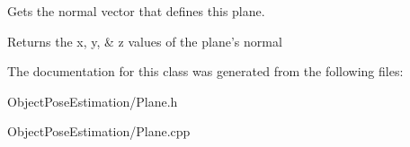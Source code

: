 Gets the normal vector that defines this plane. 

\begin{DoxyReturn}{Returns}
the x, y, \& z values of the plane's normal 
\end{DoxyReturn}


The documentation for this class was generated from the following files\-:\begin{DoxyCompactItemize}
\item 
Object\-Pose\-Estimation/Plane.\-h\item 
Object\-Pose\-Estimation/Plane.\-cpp\end{DoxyCompactItemize}
